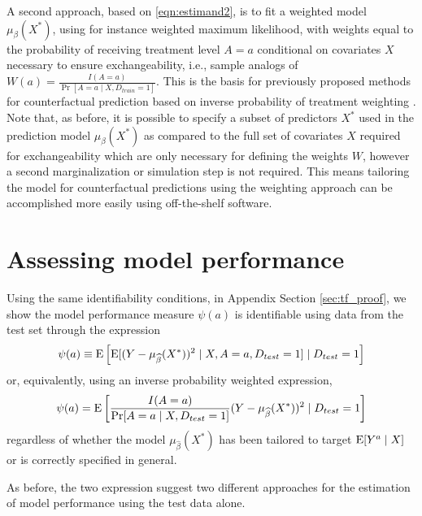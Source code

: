 A second approach, based on \ref{eqn:estimand2}, is to fit a weighted model $\mu_\beta(X^*)$, using for instance weighted maximum likelihood, with weights equal to the probability of receiving treatment level $A = a$ conditional on covariates $X$ necessary to ensure exchangeability, i.e., sample analogs of $W(a) = \frac{I(A = a)}{\Pr[A = a \mid X, D_{train} = 1]}$. This is the basis for previously proposed methods for counterfactual prediction based on inverse probability of treatment weighting \cite{sperrin_using_2018, van_geloven_prediction_2020}. Note that, as before, it is possible to specify a subset of predictors $X^*$ used in the prediction model $\mu_\beta(X^*)$ as compared to the full set of covariates $X$ required for exchangeability which are only necessary for defining the weights $W$, however a second marginalization or simulation step is not required. This means tailoring the model for counterfactual predictions using the weighting approach can be accomplished more easily using off-the-shelf software.


\section{Assessing model performance} \label{sec:performance}

Using the same identifiability conditions, in Appendix Section \ref{sec:tf_proof}, we show the model performance measure $\psi(a)$ is identifiable using data from the test set through the expression
\begin{equation}\label{eqn:mse1}
    \psi(a) \equiv \operatorname{E}\left[\operatorname{E}[(Y - \mu_{\widehat{\beta}}(X^*))^2 \mid X, A=a, D_{test} = 1] \mid D_{test} = 1\right]
\end{equation}
or, equivalently, using an inverse probability weighted expression, 
\begin{equation}\label{eqn:mse2}
    \psi(a) = \operatorname{E}\left[\frac{I(A = a)}{\Pr[A = a \mid X, D_{test} = 1]}(Y - \mu_{\widehat{\beta}}(X^*))^2 \mid D_{test} = 1\right]
\end{equation}
regardless of whether the model $\mu_{\widehat{\beta}}(X^*)$ has been tailored to target $\operatorname{E}[Y^a \mid X]$ or is correctly specified in general. 

As before, the two expression suggest two different approaches for the estimation of model performance using the test data alone. 

